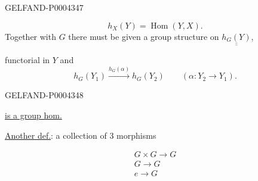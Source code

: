 \begin{GelfandAdjacentEvidence}{GELFAND-P000434}{7}

\begingroup\color{black}\begin{equation*}
h_X (Y)=\operatorname{Hom}(Y, X).
\end{equation*}\endgroup
Together with $G$ there must be given a group structure on $\underline{\underline{h_G (Y)}}$,


functorial in $Y$ and
\begingroup\color{black}\begin{equation*}
h_G (Y_1)\overset{h_G (\alpha)}{\longrightarrow}h_G (Y_2)
\qquad (\alpha: Y_2\longrightarrow Y_1).
\end{equation*}\endgroup
{}
\end{GelfandAdjacentEvidence}
\begin{GelfandAdjacentEvidence}{GELFAND-P000434}{8}

\underline{is a group hom.}



\underline{Another def.}: a collection of 3 morphisms


\begingroup\color{black}\begin{gather*}
G\times G\longrightarrow G\\
G\longrightarrow G\\
e\longrightarrow G
\end{gather*}\endgroup
{}
\end{GelfandAdjacentEvidence}
